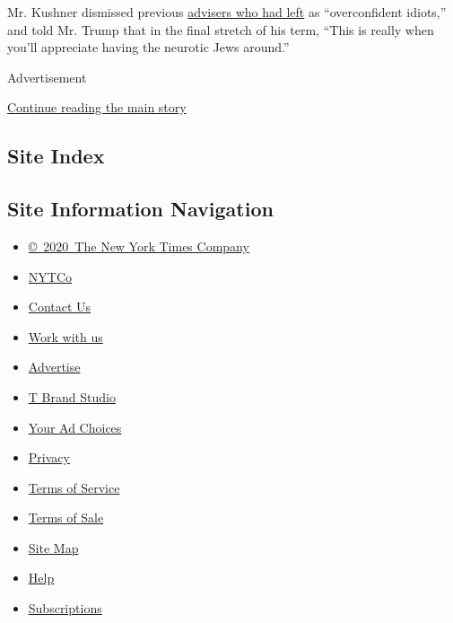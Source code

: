 Mr. Kushner dismissed previous
\href{https://www.nytimes3xbfgragh.onion/interactive/2018/03/16/us/politics/all-the-major-firings-and-resignations-in-trump-administration.html}{advisers
who had left} as ``overconfident idiots,'' and told Mr. Trump that in
the final stretch of his term, ``This is really when you'll appreciate
having the neurotic Jews around.''

Advertisement

\protect\hyperlink{after-bottom}{Continue reading the main story}

\hypertarget{site-index}{%
\subsection{Site Index}\label{site-index}}

\hypertarget{site-information-navigation}{%
\subsection{Site Information
Navigation}\label{site-information-navigation}}

\begin{itemize}
\tightlist
\item
  \href{https://help.nytimes3xbfgragh.onion/hc/en-us/articles/115014792127-Copyright-notice}{©~2020~The
  New York Times Company}
\end{itemize}

\begin{itemize}
\tightlist
\item
  \href{https://www.nytco.com/}{NYTCo}
\item
  \href{https://help.nytimes3xbfgragh.onion/hc/en-us/articles/115015385887-Contact-Us}{Contact
  Us}
\item
  \href{https://www.nytco.com/careers/}{Work with us}
\item
  \href{https://nytmediakit.com/}{Advertise}
\item
  \href{http://www.tbrandstudio.com/}{T Brand Studio}
\item
  \href{https://www.nytimes3xbfgragh.onion/privacy/cookie-policy\#how-do-i-manage-trackers}{Your
  Ad Choices}
\item
  \href{https://www.nytimes3xbfgragh.onion/privacy}{Privacy}
\item
  \href{https://help.nytimes3xbfgragh.onion/hc/en-us/articles/115014893428-Terms-of-service}{Terms
  of Service}
\item
  \href{https://help.nytimes3xbfgragh.onion/hc/en-us/articles/115014893968-Terms-of-sale}{Terms
  of Sale}
\item
  \href{https://spiderbites.nytimes3xbfgragh.onion}{Site Map}
\item
  \href{https://help.nytimes3xbfgragh.onion/hc/en-us}{Help}
\item
  \href{https://www.nytimes3xbfgragh.onion/subscription?campaignId=37WXW}{Subscriptions}
\end{itemize}
